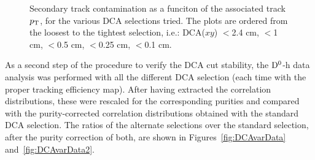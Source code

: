 \begin{figure}[h]
 \caption{Secondary track contamination as a funciton of the associated track $p_{\rm T}$, for the various DCA selections tried. The plots are ordered from the loosest to the tightest selection, i.e.: DCA($xy$) $<$2.4 cm, $<$1 cm, $<$0.5 cm, $<$0.25 cm, $<$0.1 cm.}
 \label{fig:DCAvar}
\end{figure}

As a second step of the procedure to verify the DCA cut stability, the ${\rm D^0}$-h data analysis was performed with all the different DCA selection (each time with the proper tracking efficiency map). After having extracted the correlation distributions, these were rescaled for the corresponding purities and compared with the purity-corrected correlation distributions obtained with the standard DCA selection.
The ratios of the alternate selections over the standard selection, after the purity correction of both, are shown in Figures~\ref{fig:DCAvarData} and~\ref{fig:DCAvarData2}.

